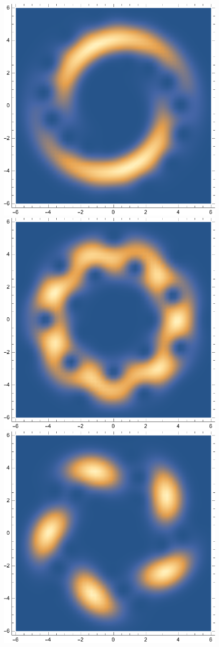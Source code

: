 \documentclass{article}
\theoremstyle{definition}
\begin{document}
\begin{enumerate}[label=\alph*)]
\begin{figure}[!htb]
\begin{minipage}{.24\textwidth}
  	\includegraphics[width=.7\linewidth]{figures/5-68.eps}
	\end{minipage}
	\begin{minipage}{.24\textwidth}
  	\centering
  	\includegraphics[width=.7\linewidth]{figures/5-72.eps}
	\end{minipage}
	\begin{minipage}{.24\textwidth}
  	\centering
  	\includegraphics[width=.7\linewidth]{figures/5-76.eps}

\end{minipage}
\end{figure}
\end{enumerate}
\end{document}
